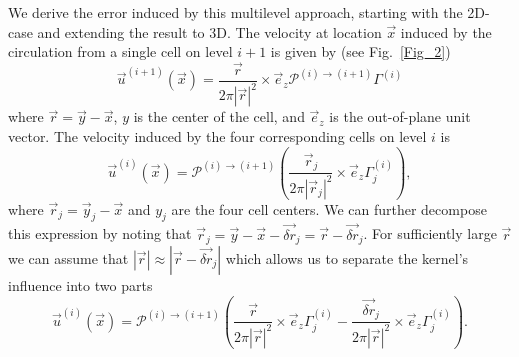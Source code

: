 \documentclass[final,1p,times]{elsarticle}
\begin{document}
We derive the error induced by this multilevel approach, starting with the 2D-case and extending the result to 3D. The velocity at location $\vec x$ induced by the circulation from a single cell on level $i+1$ is given by (see Fig.~\ref{Fig_2})
\begin{equation}\label{eq:induced_1}
    \vec{u}^{(i+1)}(\vec{x}) = \frac{\vec{r}}{2\pi|\vec{r}|^2}\times\vec{e}_z\mathcal{P}^{(i)\to(i+1)}\Gamma^{(i)}
\end{equation}
where $\vec{r}=\vec{y}-\vec{x}$, $y$ is the center of the cell, and $\vec{e}_z$ is the out-of-plane unit vector. The velocity induced by the four corresponding cells on level $i$ is
\begin{equation}
    \vec{u}^{(i)}(\vec{x}) = \mathcal{P}^{(i)\to(i+1)}
    \left(\frac{\vec{r}_j}{2\pi|\vec{r}_j|^2}\times\vec{e}_z\Gamma^{(i)}_j\right),
\end{equation}
where $\vec{r}_j=\vec{y}_j-\vec{x}$ and $y_j$ are the four cell centers. We can further decompose this expression by noting that $\vec{r}_j=\vec{y}-\vec{x}-\vec{\delta r}_j=\vec{r}-\vec{\delta r}_j$.
For sufficiently large $\vec{r}$ we can assume that $|\vec{r}|\approx|\vec{r}-\vec{\delta r}_j|$ %
which allows us to separate the kernel's influence into two parts
\begin{equation}
    \vec{u}^{(i)}(\vec{x}) = \mathcal{P}^{(i)\to(i+1)}    \left(\frac{\vec{r}}{2\pi|\vec{r}|^2}\times\vec{e}_z\Gamma^{(i)}_j-\frac{\vec{\delta r}_j}{2\pi|\vec{r}|^2}\times\vec{e}_z\Gamma^{(i)}_j\right).
\end{equation}
\end{document}
